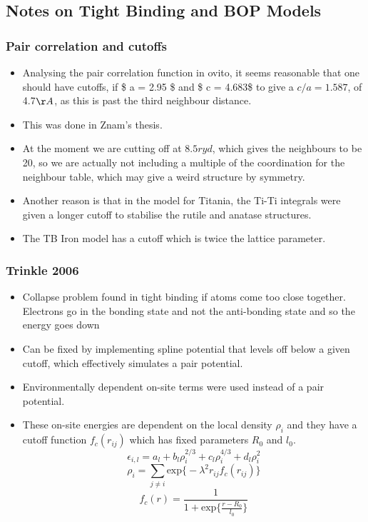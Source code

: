 \documentclass[11pt]{article}
\begin{document}
\subsection{Notes on Tight Binding and BOP Models}
\label{sec:orge1cae58}

\subsubsection{Pair correlation and cutoffs}
\label{sec:orgb198262}
\begin{itemize}
\item Analysing the pair correlation function in ovito, it seems reasonable
that one should have cutoffs, if \$ a = 2.95 \$ and \$ c = 4.683\$ to give a
\(c/a = 1.587\), of 4.7\(\AA\), as this is past the third neighbour
distance.
\item This was done in Znam's thesis.
\item At the moment we are cutting off at \(8.5 ryd\), which gives the
neighbours to be 20, so we are actually not including a multiple of the
coordination for the neighbour table, which may give a weird structure
by symmetry.
\item Another reason is that in the model for Titania, the Ti-Ti integrals
were given a longer cutoff to stabilise the rutile and anatase
structures.
\item The TB Iron model has a cutoff which is twice the lattice parameter.
\end{itemize}
\subsubsection{Trinkle 2006}
\label{sec:org281567a}
\begin{itemize}
\item Collapse problem found in tight binding if atoms come too close
together. Electrons go in the bonding state and not the anti-bonding
state and so the energy goes down
\item Can be fixed by implementing spline potential that levels off below a
given cutoff, which effectively simulates a pair potential.
\item Environmentally dependent on-site terms were used instead of a pair potential.
\item These on-site energies are dependent on the local density \(\rho_{i}\) and
they have a cutoff function \(f_{c}(r_{ij})\) which has fixed parameters
\(R_{0}\) and \(l_{0}\).\[
      \epsilon_{i,l} = a_{l} + b_{l}\rho_{i}^{2/3} + c_{l}\rho_{i}^{4/3} +
      d_{l}\rho_{i}^{2}\] 
\[ \rho_{i} = \sum_{j \neq i} \text{exp}\big\{ -\lambda^{2} r_{ij}
      f_{c}(r_{ij}) \big\} \]
\[ f_{c}(r) = \frac{1}{1 + \text{exp}\Big\{  \frac{r-R_{0}}{l_{0}}\Big\}
      }\]
\end{itemize}
\end{document}
